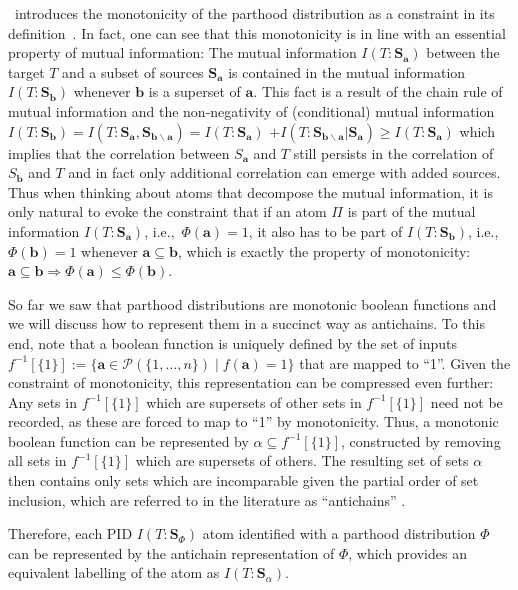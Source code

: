 \documentclass[10pt]{article}
\theoremstyle{definition}
\theoremstyle{plain}
\begin{document}
\citeauthor{gutknecht_bits_2021}\ introduces the monotonicity of the parthood distribution as a constraint in its definition~\cite[definition 2.1.]{gutknecht_bits_2021}. In fact, one can see that this monotonicity is in line with an essential property of mutual information: The mutual information $I(T:\bm S_{\bm a})$ between the target $T$ and a subset of sources $\bm S_{\bm a}$ is contained in the mutual information $I(T:\bm S_{\bm b})$ whenever $\bm b$ is a superset of $\bm a$. This fact is a result of the chain rule of mutual information and the non-negativity of (conditional) mutual information \citep{cover2006elements} $I(T:\bm S_{\bm b}) = I(T:\bm S_{\bm a}, \bm S_{\bm b \backslash \bm a}) = I(T: \bm S_{\bm a}) $ $+ I(T: \bm S_{\bm b \backslash \bm a}| \bm S_{\bm a}) \geq I(T: \bm S_{\bm a})$ which implies that the correlation between $S_{\bm a}$ and $T$ still persists in the correlation of $S_{\bm b}$ and $T$ and in fact only additional correlation can emerge with added sources. Thus when thinking about atoms that decompose the mutual information, it is only natural to evoke the constraint that if an atom $\Pi$ is part of the mutual information $I(T:\bm S_{\bm a})$, i.e.,~$\Phi(\bm a) = 1$, it also has to be part of $I(T:\bm S_{\bm b})$, i.e.,~$\Phi(\bm b) = 1$ whenever $\bm a \subseteq \bm b$, which is exactly the property of monotonicity: $\bm a \subseteq \bm b \Rightarrow \Phi(\bm a) \leq \Phi(\bm b)$.

So far we saw that parthood distributions are monotonic boolean functions and we will discuss how to represent them in a succinct way as antichains. To this end, note that a boolean function is uniquely defined by the set of inputs $f^{-1}[\{1\}]:= \{\bm a\in\mathcal{P}(\{1, \dots, n\}) \mid f(\bm a) = 1\}$ that are mapped to ``1''. Given the constraint of monotonicity, this representation can be compressed even further: Any sets in $f^{-1}[\{1\}]$ which are supersets of other sets in $f^{-1}[\{1\}]$ need not be recorded, as these are forced to map to ``1'' by monotonicity. Thus, a monotonic boolean function can be represented by $\alpha \subseteq f^{-1}[\{1\}]$, constructed by removing all sets in $f^{-1}[\{1\}]$ which are supersets of others. The resulting set of sets $\alpha$ then contains only sets which are incomparable given the partial order of set inclusion, which are referred to in the literature as ``antichains'' \citep{williams_nonnegative_2010}.

Therefore, each PID $I(T:\bm S_\Phi)$ atom identified with a parthood distribution $\Phi$ can be represented by the antichain representation of $\Phi$, which provides an equivalent labelling of the atom as $I(T:\bm S_\alpha)$.
\end{document}
